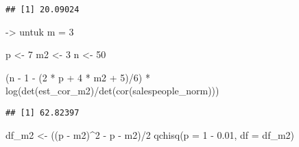 \documentclass[
]{article}
\newenvironment{Shaded}{\begin{snugshade}}{\end{snugshade}}
\newcommand{\AttributeTok}[1]{\textcolor[rgb]{0.77,0.63,0.00}{#1}}
\newcommand{\DecValTok}[1]{\textcolor[rgb]{0.00,0.00,0.81}{#1}}
\newcommand{\FloatTok}[1]{\textcolor[rgb]{0.00,0.00,0.81}{#1}}
\newcommand{\FunctionTok}[1]{\textcolor[rgb]{0.00,0.00,0.00}{#1}}
\newcommand{\NormalTok}[1]{#1}
\newcommand{\OtherTok}[1]{\textcolor[rgb]{0.56,0.35,0.01}{#1}}
\newcommand{\SpecialCharTok}[1]{\textcolor[rgb]{0.00,0.00,0.00}{#1}}
\begin{document}
\begin{verbatim}
## [1] 20.09024
\end{verbatim}

-\textgreater{} untuk m = 3

\begin{Shaded}
\end{Shaded}

\begin{Shaded}
\begin{Highlighting}[]
\NormalTok{p }\OtherTok{\textless{}{-}} \DecValTok{7}
\NormalTok{m2 }\OtherTok{\textless{}{-}} \DecValTok{3}
\NormalTok{n }\OtherTok{\textless{}{-}} \DecValTok{50}

\NormalTok{(n }\SpecialCharTok{{-}} \DecValTok{1} \SpecialCharTok{{-}}\NormalTok{ (}\DecValTok{2} \SpecialCharTok{*}\NormalTok{ p }\SpecialCharTok{+} \DecValTok{4} \SpecialCharTok{*}\NormalTok{ m2 }\SpecialCharTok{+} \DecValTok{5}\NormalTok{)}\SpecialCharTok{/}\DecValTok{6}\NormalTok{) }\SpecialCharTok{*} \FunctionTok{log}\NormalTok{(}\FunctionTok{det}\NormalTok{(est\_cor\_m2)}\SpecialCharTok{/}\FunctionTok{det}\NormalTok{(}\FunctionTok{cor}\NormalTok{(salespeople\_norm)))}
\end{Highlighting}
\end{Shaded}

\begin{verbatim}
## [1] 62.82397
\end{verbatim}

\begin{Shaded}
\begin{Highlighting}[]
\NormalTok{df\_m2 }\OtherTok{\textless{}{-}}\NormalTok{ ((p }\SpecialCharTok{{-}}\NormalTok{ m2)}\SpecialCharTok{\^{}}\DecValTok{2} \SpecialCharTok{{-}}\NormalTok{ p }\SpecialCharTok{{-}}\NormalTok{ m2)}\SpecialCharTok{/}\DecValTok{2}
\FunctionTok{qchisq}\NormalTok{(}\AttributeTok{p =} \DecValTok{1} \SpecialCharTok{{-}} \FloatTok{0.01}\NormalTok{, }\AttributeTok{df =}\NormalTok{ df\_m2)}
\end{Highlighting}
\end{Shaded}
\end{document}
